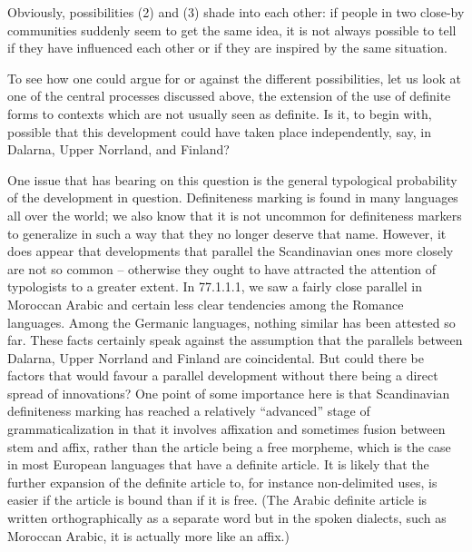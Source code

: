 \begin{styleBodyTextFirst}
Obviously, possibilities (2) and (3) shade into each other: if people in two close-by communities suddenly seem to get the same idea, it is not always possible to tell if they have influenced each other or if they are inspired by the same situation. 

\end{styleBodyTextFirst}

\begin{styleBodytextC}
To see how one could argue for or against the different possibilities, let us look at one of the central processes discussed above, the extension of the use of definite forms to contexts which are not usually seen as definite. Is it, to begin with, possible that this development could have taken place independently, say, in Dalarna, Upper Norrland, and Finland? 

\end{styleBodytextC}

\begin{styleBodytextC}
One issue that has bearing on this question is the general typological probability of the development in question. Definiteness marking is found in many languages all over the world; we also know that it is not uncommon for definiteness markers to generalize in such a way that they no longer deserve that name. However, it does appear that developments that parallel the Scandinavian ones more closely are not so common – otherwise they ought to have attracted the attention of typologists to a greater extent. In 77.1.1.1, we saw a fairly close parallel in Moroccan Arabic and certain less clear tendencies among the Romance languages. Among the Germanic languages, nothing similar has been attested so far. These facts certainly speak against the assumption that the parallels between Dalarna, Upper Norrland and Finland are coincidental. But could there be factors that would favour a parallel development without there being a direct spread of innovations? One point of some importance here is that Scandinavian definiteness marking has reached a relatively “advanced” stage of grammaticalization in that it involves affixation and sometimes fusion between stem and affix, rather than the article being a free morpheme, which is the case in most European languages that have a definite article. It is likely that the further expansion of the definite article to, for instance non-delimited uses, is easier if the article is bound than if it is free. (The Arabic definite article is written orthographically as a separate word but in the spoken dialects, such as Moroccan Arabic, it is actually more like an affix.) 

\end{styleBodytextC}

